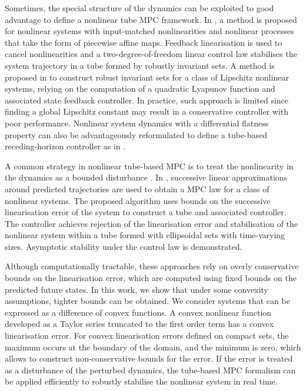 \documentclass[letterpaper, 10 pt, conference]{ieeeconf}
\begin{document}
Sometimes, the special structure of the dynamics can be exploited to good advantage to define a nonlinear tube MPC framework. In \cite{rakovic2006simple}, a method is proposed for nonlinear systems with input-matched nonlinearities and nonlinear processes that take the form of piecewise affine maps. Feedback linearisation is used to cancel nonlinearities and a two-degree-of-freedom linear control law stabilises the system trajectory in a tube formed by robustly invariant sets. A method is proposed in \cite{yu2013tube} to construct robust invariant sets for a class of Lipschitz nonlinear systems, relying on the computation of a quadratic Lyapunov function and associated state feedback controller. In practice, such approach is limited since finding a global Lipschitz constant may result in a conservative controller with poor performance. Nonlinear system dynamics with a differential flatness property can also be advantageously reformulated to define a tube-based receding-horizon controller as in \cite{petkar2016robust}.

A common strategy in nonlinear tube-based MPC is to treat the nonlinearity in the dynamics as a bounded disturbance \cite{lee2002constrained, althoff2008reachability, cannon2009successive, mark}. In \cite{mark}, successive linear approximations around predicted trajectories are used to obtain a MPC law for a class of nonlinear systems. The proposed algorithm uses bounds on the  successive linearisation error of the system to construct a tube and associated controller. The controller achieves rejection of the linearisation error and stabilisation of the nonlinear system within a tube formed with  ellipsoidal sets with time-varying sizes. Asymptotic stability under the control law is demonstrated.

Although computationally tractable, these approaches rely on overly conservative bounds on the linearisation error, which are computed using fixed bounds on the predicted future states. In this work, we show that under some convexity assumptions, tighter bounds can be obtained. We consider systems that can be expressed as a difference of convex functions. A convex nonlinear function developed as a Taylor series truncated to the first order term has a convex  linearisation error.  For convex  linearisation errors defined on compact sets, the maximum occurs at the boundary of the domain, and the minimum is zero, which allows to construct non-conservative bounds for the error. If the error is treated as a disturbance of the perturbed dynamics, the tube-based MPC formalism can be applied efficiently to robustly stabilise the nonlinear system in real time. 
\end{document}

